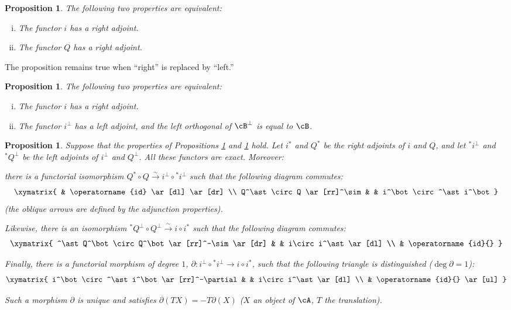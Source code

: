 \documentclass[12pt,oneside,english]{smfbook}
\newcommand{\iso}{\xrightarrow\sim}
\newtheorem{proposition}[subsubsection]{Proposition}
\begin{document}
\begin{proposition}\label{VIII:2-6-5}
The following two properties are equivalent:
\begin{enumerate}[(i)]
  \item The functor $i$ has a right adjoint.
  \item The functor $Q$ has a right adjoint.
\end{enumerate}
\end{proposition}

The proposition remains true when ``right'' is replaced by ``left.''

\begin{proposition}\label{VIII:2-6-6}
The following two properties are equivalent:
\begin{enumerate}[(i)]
  \item The functor $i$ has a right adjoint.
  \item The functor $i^\bot$ has a left adjoint, and the left orthogonal of $\cB^\bot$ is equal to $\cB$.
\end{enumerate}
\end{proposition}

\begin{proposition}\label{VIII:2-6-7}
Suppose that the properties of Propositions \ref{VIII:2-6-5} and \ref{VIII:2-6-6} hold. Let $i^\ast$ and $Q^\ast$ be the right adjoints of $i$ and $Q$, and let $^\ast i^\bot$ and $^\ast Q^\bot$ be the left adjoints of $i^\bot$ and $Q^\bot$. All these functors are exact. Moreover:

there is a functorial isomorphism $Q^\ast\circ Q\iso i^\bot\circ{}^\ast i^\bot$ such that the following diagram commutes:
\[\xymatrix{
  & \operatorname{id} \ar[dl] \ar[dr] \\
  Q^\ast \circ Q \ar[rr]^\sim
    & & i^\bot\circ ^\ast i^\bot
}\]
(the oblique arrows are defined by the adjunction properties).

Likewise, there is an isomorphism $^\ast Q^\bot\circ Q^\bot\iso i\circ i^\ast$ such that the following diagram commutes:
\[\xymatrix{
  ^\ast Q^\bot\circ Q^\bot \ar[rr]^-\sim \ar[dr]
    & & i\circ i^\ast \ar[dl] \\
  & \operatorname{id}{}
}\]

Finally, there is a functorial morphism of degree $1$, $\partial:i^\bot\circ{}^\ast i^\bot\to i\circ i^\ast$, such that the following triangle is distinguished ($\deg\partial=1$):
\[\xymatrix{
  i^\bot \circ ^\ast i^\bot \ar[rr]^-\partial
    & & i\circ i^\ast \ar[dl] \\
  & \operatorname{id}{} \ar[ul]
}\]

Such a morphism $\partial$ is unique and satisfies $\partial(TX)=-T\partial(X)$ ($X$ an object of $\cA$, $T$ the translation).
\end{proposition}
\end{document}
